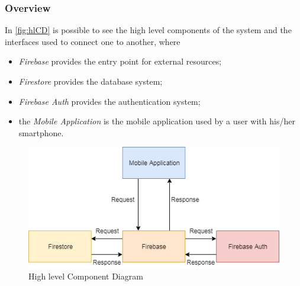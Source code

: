 \subsubsection{Overview}
In \autoref{fig:hlCD} is possible to see the high level components of the system and the interfaces used to connect one to another, where
\begin{itemize}
	\item \emph{Firebase} provides the entry point for external resources;
		\item \emph{Firestore} provides the database system;
			\item \emph{Firebase Auth} provides the authentication system;
	\item the \emph{Mobile Application} is the mobile application used by a user with his/her smartphone.
\end{itemize}

\begin{figure}[H]
	\includegraphics[width = \textwidth, keepaspectratio = true]{Img/HighLevelComponent}
	\caption{High level Component Diagram}
	\label{fig:hlCD}
\end{figure}

\clearpage
